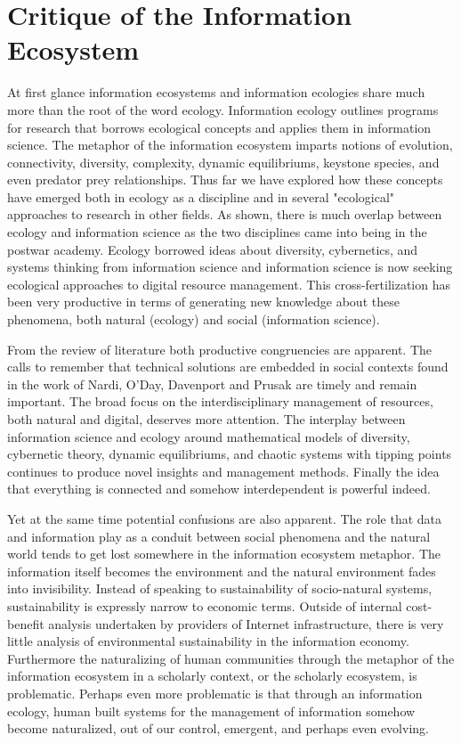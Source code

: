 \section{Critique of the Information Ecosystem}

At first glance information ecosystems and information ecologies share much more than the root of the word ecology. Information ecology outlines programs for research that borrows ecological concepts and applies them in information science.  The metaphor of the information ecosystem imparts notions of evolution, connectivity, diversity, complexity, dynamic equilibriums, keystone species, and even predator prey relationships. Thus far we have explored how these concepts have emerged both in ecology as a discipline and in several "ecological" approaches to research in other fields. As shown, there is much overlap between ecology and information science as the two disciplines came into being in the postwar academy. Ecology borrowed ideas about diversity, cybernetics, and systems thinking from information science and information science is now seeking ecological approaches to digital resource management. This cross-fertilization has been very productive in terms of generating new knowledge about these phenomena, both natural (ecology) and social (information science). 

From the review of literature both productive congruencies are apparent. The calls to remember that technical solutions are embedded in social contexts found in the work of Nardi, O'Day, Davenport and Prusak are timely and remain important. The broad focus on the interdisciplinary management of resources, both natural and digital, deserves more attention. The interplay between information science and ecology around mathematical models of diversity, cybernetic theory, dynamic equilibriums, and chaotic systems with tipping points continues to produce novel insights and management methods. Finally the idea that everything is connected and somehow interdependent is powerful indeed.

Yet at the same time potential confusions are also apparent. The role that data and information play as a conduit between social phenomena and the natural world tends to get lost somewhere in the information ecosystem metaphor. The information itself becomes the environment and the natural environment fades into invisibility. Instead of speaking to sustainability of socio-natural systems, sustainability is expressly narrow to economic terms. Outside of internal cost-benefit analysis undertaken by providers of Internet infrastructure, there is very little analysis of environmental sustainability in the information economy. Furthermore the naturalizing of human communities through the metaphor of the information ecosystem in a scholarly context, or the scholarly ecosystem, is problematic. Perhaps even more problematic is that through an information ecology, human built systems for the management of information somehow become naturalized, out of our control, emergent, and perhaps even evolving.

